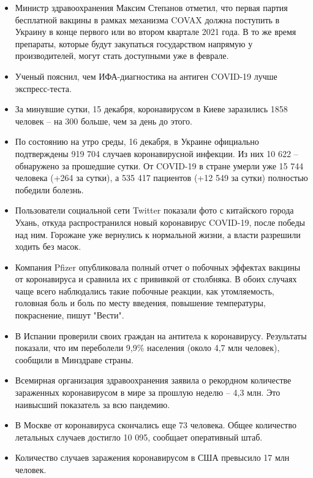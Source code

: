 \begin{itemize}

\item Министр здравоохранения Максим Степанов отметил, что первая партия
бесплатной вакцины в рамках механизма COVAX должна поступить в Украину в
конце первого или во втором квартале 2021 года. В то же время препараты,
которые будут закупаться государством напрямую у производителей, могут
стать доступными уже в феврале.

\item Ученый пояснил, чем ИФА-диагностика на антиген COVID-19 лучше экспресс-теста.

\item За минувшие сутки, 15 декабря, коронавирусом в Киеве заразились 1858 человек – на 300 больше, чем за день до этого.

\item По состоянию на утро среды, 16 декабря, в Украине официально подтверждены 919 704 случаев коронавирусной инфекции. Из них 10 622 – обнаружено за прошедшие сутки. От COVID-19 в стране умерли уже 15 744 человека (+264 за сутки), а 535 417 пациентов (+12 549 за сутки) полностью победили болезнь.

\item Пользователи социальной сети Twitter показали фото с китайского города Ухань, откуда распространился новый коронавирус COVID-19, после победы над ним. Горожане уже вернулись к нормальной жизни, а власти разрешили ходить без масок.

\item Компания Pfizer опубликовала полный отчет о побочных эффектах вакцины от коронавируса и сравнила их с прививкой от столбняка. В обоих случаях чаще всего наблюдались такие побочные реакции, как утомляемость, головная боль и боль по месту введения, повышение температуры, покраснение, пишут "Вести".

\item В Испании проверили своих граждан на антитела к коронавирусу. Результаты
показали, что им переболели 9,9\% населения (около 4,7 млн человек), сообщили в
Минздраве страны.

\item Всемирная организация здравоохранения заявила о рекордном количестве зараженных коронавирусом в мире за прошлую неделю – 4,3 млн. Это наивысший показатель за всю пандемию.

\item В Москве от коронавируса скончались еще 73 человека. Общее количество летальных случаев достигло 10 095, сообщает оперативный штаб.

\item Количество случаев заражения коронавирусом в США превысило 17 млн человек.
\end{itemize}

